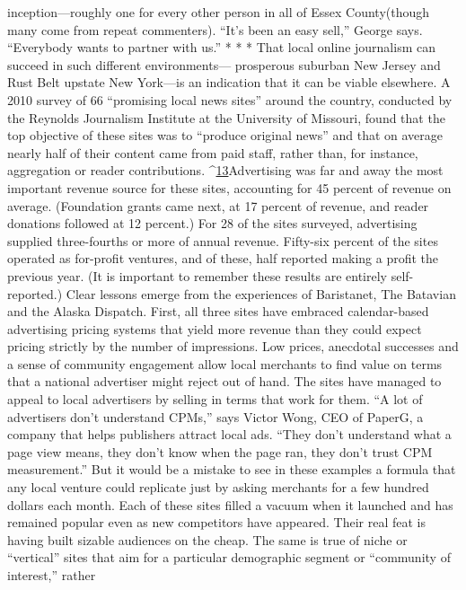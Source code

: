 inception—roughly one for every other person in all of Essex County(though
many come from repeat commenters). ``It's been an easy sell,'' George says. ``Everybody
wants to partner with us.''
* * *
That local online journalism can succeed in such different environments—
prosperous suburban New Jersey and Rust Belt upstate New York—is an indication
that it can be viable elsewhere. A 2010 survey of 66 ``promising local news
sites'' around the country, conducted by the Reynolds Journalism Institute at the
University of Missouri, found that the top objective of these sites was to ``produce
original news'' and that on average nearly half of their content came from
paid staff, rather than, for instance, aggregation or reader contributions. ^{\href{#endnotes-chapter-3}{13}}Advertising was far and away the most important revenue source for these sites,
accounting for 45 percent of revenue on average. (Foundation grants came next,
at 17 percent of revenue, and reader donations followed at 12 percent.) For 28 of
the sites surveyed, advertising supplied three-fourths or more of annual revenue.
Fifty-six percent of the sites operated as for-profit ventures, and of these, half
reported making a profit the previous year. (It is important to remember these
results are entirely self-reported.)
Clear lessons emerge from the experiences of Baristanet, The Batavian and the
Alaska Dispatch. First, all three sites have embraced calendar-based advertising
pricing systems that yield more revenue than they could expect pricing strictly
by the number of impressions. Low prices, anecdotal successes and a sense of
community engagement allow local merchants to find value on terms that a
national advertiser might reject out of hand. The sites have managed to appeal to
local advertisers by selling in terms that work for them. ``A lot of advertisers don't
understand CPMs,'' says Victor Wong, CEO of PaperG, a company that helps
publishers attract local ads. ``They don't understand what a page view means, they
don't know when the page ran, they don't trust CPM measurement.''
But it would be a mistake to see in these examples a formula that any local
venture could replicate just by asking merchants for a few hundred dollars each
month. Each of these sites filled a vacuum when it launched and has remained
popular even as new competitors have appeared. Their real feat is having built
sizable audiences on the cheap. The same is true of niche or ``vertical'' sites that
aim for a particular demographic segment or ``community of interest,'' rather

